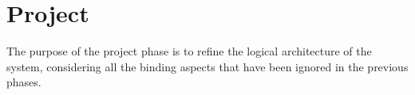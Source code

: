 \section{Project}
The purpose of the project phase is to refine the logical architecture of the system, considering all the binding aspects that have been ignored in the previous phases.


